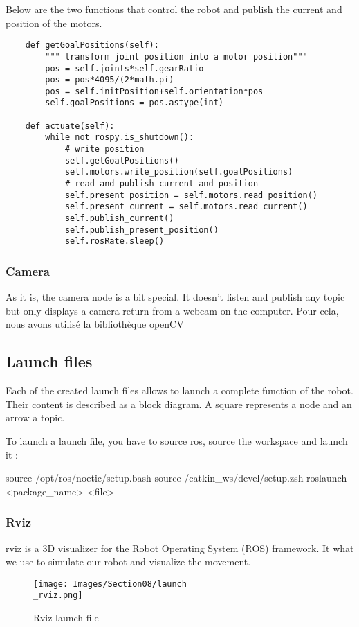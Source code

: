 \bigbreak
Below are the two functions that control the robot and publish the current and position of the motors.
\begin{verbatim}
    def getGoalPositions(self):
        """ transform joint position into a motor position"""
        pos = self.joints*self.gearRatio
        pos = pos*4095/(2*math.pi)
        pos = self.initPosition+self.orientation*pos
        self.goalPositions = pos.astype(int)
        
    def actuate(self):
        while not rospy.is_shutdown():
            # write position
            self.getGoalPositions()
            self.motors.write_position(self.goalPositions)
            # read and publish current and position
            self.present_position = self.motors.read_position()
            self.present_current = self.motors.read_current()
            self.publish_current()
            self.publish_present_position()
            self.rosRate.sleep()
\end{verbatim}

\subsubsection{Camera}
As it is, the camera node is a bit special. It doesn't listen and publish any topic but only displays a camera return from a webcam on the computer. Pour cela, nous avons utilisé la bibliothèque openCV

\subsection{Launch files}

Each of the created launch files allows to launch a complete function of the robot. Their content is described as a block diagram. A square represents a node and an arrow a topic. 

\bigbreak
To launch a launch file, you have to source ros, source the workspace and launch it :
\begin{commandshell}
    source /opt/ros/noetic/setup.bash
    source /catkin_ws/devel/setup.zsh
    roslaunch <package_name> <file>
\end{commandshell} 

\subsubsection{Rviz}

rviz is a 3D visualizer for the Robot Operating System (ROS) framework. It what we use to simulate our robot and visualize the movement.
\bigbreak
\begin{figure}[ht]
    \centering
    \texttt{[image: Images/Section08/launch\\\_rviz.png]}
    \caption{Rviz launch file}
    \label{fig:RvizLaunch}
\end{figure}
\FloatBarrier

